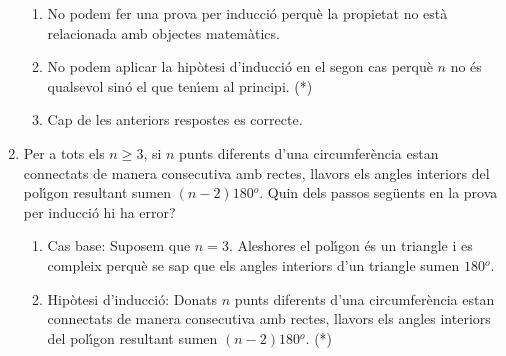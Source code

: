 \begin{enumerate}
\begin{enumerate}
\item No podem fer una prova per inducci\'{o} perqu\`{e} la propietat no
est\`{a} relacionada amb objectes matem\`{a}tics.

\item No podem aplicar la hip\`{o}tesi d'inducci\'{o} en el segon cas
perqu\`{e} $n$ no \'{e}s qualsevol sin\'{o} el que ten\'{\i}em al principi. (*)

\item Cap de les anteriors respostes es correcte.
\end{enumerate}

\item Per a tots els $n\geq3$, si $n$ punts diferents d'una circumfer\`{e}ncia
estan connectats de manera consecutiva amb rectes, llavors els angles
interiors del pol\'{\i}gon resultant sumen $\left(  n-2\right)  180%
{{}^o}%
$. Quin dels passos seg\"{u}ents en la prova per inducci\'{o} hi ha error?

\begin{enumerate}
\item Cas base: Suposem que $n=3$. Aleshores el pol\'{\i}gon \'{e}s un
triangle i es compleix perqu\`{e} se sap que els angles interiors d'un
triangle sumen $180%
{{}^o}%
$.

\item Hip\`{o}tesi d'inducci\'{o}: Donats $n$ punts diferents d'una
circumfer\`{e}ncia estan connectats de manera consecutiva amb rectes, llavors
els angles interiors del pol\'{\i}gon resultant sumen $\left(  n-2\right)  180%
{{}^o}%
$. (*)


\end{enumerate}
\end{enumerate}
